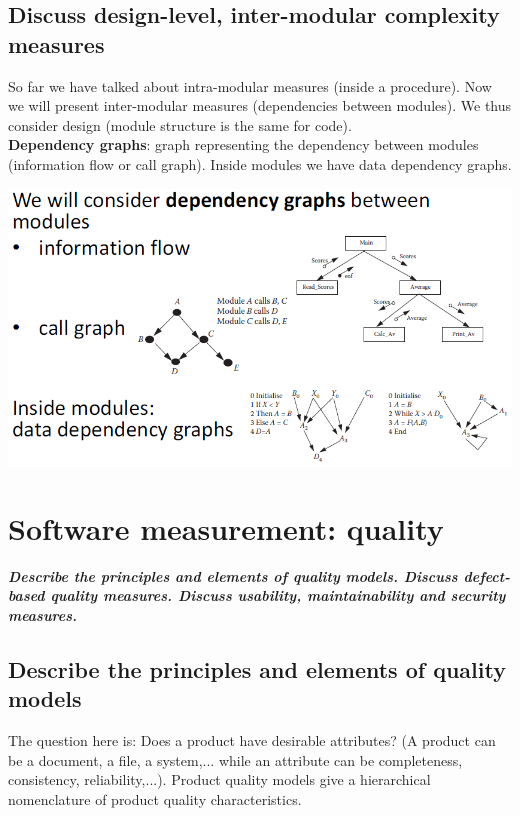 \documentclass{article}
\begin{document}
\subsection{Discuss design-level, inter-modular complexity measures}
\noindent So far we have talked about intra-modular measures (inside a procedure). Now we will present
inter-modular measures (dependencies between modules). We thus consider design (module structure
is the same for code).\\
\textbf{Dependency graphs}: graph representing the dependency between modules (information flow or call
graph). Inside modules we have data dependency graphs.
\begin{center}
        \includegraphics[scale=0.4]{36.PNG}
\end{center}


\newpage
\section{Software measurement: quality}
\textbf{\textit{Describe the principles and elements of quality models. Discuss defect-based quality measures. Discuss
usability, maintainability and security measures.}}

\subsection{Describe the principles and elements of quality models}
The question here is: Does a product have desirable attributes? (A product can be a document, a file, a
system,... while an attribute can be completeness, consistency, reliability,...).
Product quality models give a hierarchical nomenclature of product quality characteristics.\\
\end{document}
